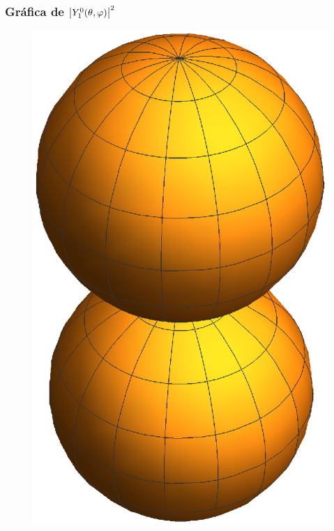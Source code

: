 \documentclass[12pt]{beamer}
\begin{document}
\begin{frame}
\frametitle{Gráfica de $\abs{Y_{1}^{0} (\theta, \varphi)}^{2}$}
\begin{figure}
    \centering
    \includegraphics[scale=0.5]{Imagenes/AE2_10.eps}
\end{figure}
\end{frame}
\end{document}

